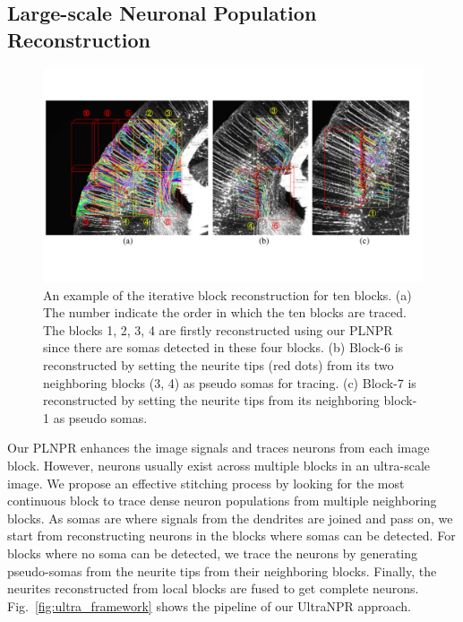 \subsection{Large-scale Neuronal Population Reconstruction}
\label{sec:UltraNPR}

\begin{figure}[t]
	\centering
	\includegraphics[width=1\columnwidth]{./Illustrations/ultranpr_block_search.pdf}
	\caption{An example of the iterative block reconstruction for ten blocks. (a) The number indicate the order in which the ten blocks are traced. The blocks 1, 2, 3, 4 are firstly reconstructed using our PLNPR since there are somas detected in these four blocks. (b) Block-6 is reconstructed by setting the neurite tips (red dots) from its two neighboring blocks (3, 4) as pseudo somas for tracing. (c) Block-7 is reconstructed by setting the neurite tips from its neighboring block-1 as pseudo somas.}
	\label{fig:blocksearch}
\end{figure}


Our PLNPR enhances the image signals and traces neurons from each image block.
However, neurons usually exist across multiple blocks in an ultra-scale image. 
% 
We propose an effective stitching process by looking for the most continuous block to trace dense neuron populations from multiple neighboring blocks. 
%
As somas are where signals from the dendrites are joined and pass on, we start from reconstructing neurons in the blocks where somas can be detected.
For blocks where no soma can be detected, we trace the neurons by generating pseudo-somas from the neurite tips from their neighboring blocks. 
%
Finally, the neurites reconstructed from local blocks are fused to get complete neurons. 
Fig.~\ref{fig:ultra_framework} shows the pipeline of our UltraNPR approach. 


